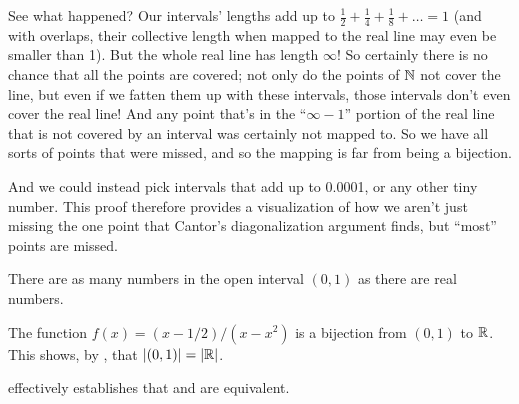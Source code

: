\begin{proofsketch}
\begin{tightfigure}
  \end{tightfigure}

  See what happened? Our intervals' lengths add up to $\frac{1}{2} +
  \frac{1}{4} + \frac{1}{8} + \dots = 1$ (and with overlaps, their
    collective length when mapped to the real line may even be smaller
  than 1). But the whole real line has length $\infty$! So certainly
  there is no chance that all the points are covered; not only do the
  points of $\mathbb N$ not cover the line, but even if we fatten them up
  with these intervals, those intervals don't even cover the real
  line! And any point that's in the ``$\infty - 1$'' portion of the
  real line that is not covered by an interval was certainly not
  mapped to. So we have all sorts of points that were missed, and so
  the mapping is far from being a bijection.

  And we could instead pick intervals that add up to 0.0001, or any
  other tiny number. This proof therefore provides a visualization of
  how we aren't just missing the one point that Cantor's
  diagonalization argument finds, but ``most'' points are missed.
\end{proofsketch}

\begin{theorem}[$\size{(0, 1)} = \size{\RR}$]
  There are as many numbers in the open interval $(0, 1)$ as there
  are real numbers.
\end{theorem}

\begin{proofidea}
  The function $f(x) = (x-1/2)/(x-x^2)$ is a bijection from $(0, 1)$
  to $\mathbb R$. This shows, by , that
  $\size{(0, 1)} = \size{\RR}$.
\end{proofidea}

\begin{remark}
   effectively establishes that
   and
   are equivalent.
\end{remark}

